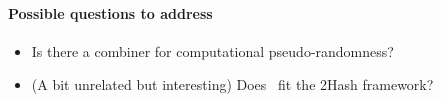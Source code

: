 
\paragraph{Possible questions to address}
\begin{itemize}
    \item Is there a combiner for computational pseudo-randomness?
    \item (A bit unrelated but interesting) Does~\cite{EC:TCRSTW22} fit the 2Hash framework?
\end{itemize}